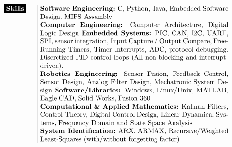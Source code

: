 \documentclass[paper=a4,fontsize=10pt]{article} %
\def \mainColWidth {0.8\textwidth}		%
\def \leftColWidth {0.125\textwidth}		%
\begin{document}
\begin{align*}
	\begin{array}[t]{l} 
	\parbox[t]{\leftColWidth}{%
		\colorbox{black}{\color{white}{\textbf{Skills}}}
	}%
	\end{array}
	&
	\begin{array}[t]{|l}
	\parbox[t]{\mainColWidth}{%
		\textbf{Software Engineering:} C, Python, Java, Embedded Software Design, MIPS Assembly\\
		\textbf{Computer Engineering:} Computer Architecture, Digital Logic Design
		\textbf{Embedded Systems:} PIC, CAN, I2C, UART, SPI, sensor integration, Input Capture / Output Compare, Free-Running Timers, Timer Interrupts, ADC, protocol debugging. Discretized PID control loops (All non-blocking and interrupt-driven).\\
		\textbf{Robotics Engineering:} Sensor Fusion, Feedback Control, Sensor Design, Analog Filter Design, Mechatronic System Design
		\textbf{Software/Libraries:} Windows, Linux/Unix, MATLAB, Eagle CAD, Solid Works, Fusion 360\\
		\textbf{Computational \& Applied Mathematics:} Kalman Filters, Control Theory, Digital Control Design, Linear Dynamical Systems, Frequency Domain and State Space Analysis\\
		\textbf{System Identification:} ARX, ARMAX, Recursive/Weighted Least-Squares (with/without forgetting factor)
	}%
	\end{array}\\
	\\
\end{align*}
\end{document}
